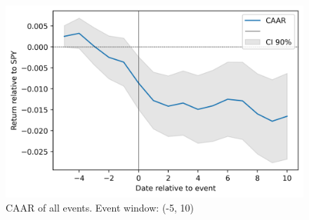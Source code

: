 \begin{figure}[h]
  \centering
  \includegraphics[width=1\textwidth]{figures/esAll.png}
  \caption{CAAR of all events. Event window: (-5, 10)}
  \label{fig:esAll}
\end{figure}



